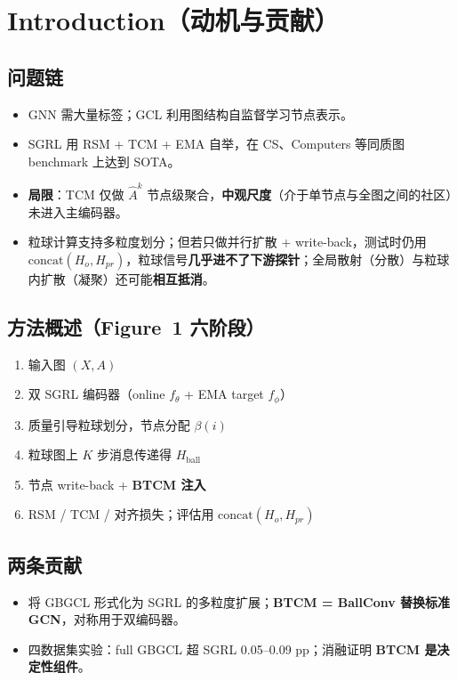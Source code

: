 \documentclass[11pt,a4paper]{article}
\begin{document}
\section{Introduction（动机与贡献）}

\subsection{问题链}
\begin{itemize}
  \item GNN 需大量标签；GCL 利用图结构自监督学习节点表示。
  \item SGRL 用 RSM + TCM + EMA 自举，在 CS、Computers 等同质图 benchmark 上达到 SOTA。
  \item \textbf{局限}：TCM 仅做 $\hat{A}^k$ 节点级聚合，\textbf{中观尺度}（介于单节点与全图之间的社区）未进入主编码器。
  \item 粒球计算支持多粒度划分；但若只做并行扩散 + write-back，测试时仍用 $\mathrm{concat}(H_o, H_{pr})$，粒球信号\textbf{几乎进不了下游探针}；全局散射（分散）与粒球内扩散（凝聚）还可能\textbf{相互抵消}。
\end{itemize}

\subsection{方法概述（Figure~1 六阶段）}
\begin{enumerate}
  \item[(a)] 输入图 $(X,A)$
  \item[(b)] 双 SGRL 编码器（online $f_\theta$ + EMA target $f_\phi$）
  \item[(c)] 质量引导粒球划分，节点分配 $\beta(i)$
  \item[(d)] 粒球图上 $K$ 步消息传递得 $H_{\mathrm{ball}}$
  \item[(e)] 节点 write-back + \textbf{BTCM 注入}
  \item[(f)] RSM / TCM / 对齐损失；评估用 $\mathrm{concat}(H_o, H_{pr})$
\end{enumerate}

\subsection{两条贡献}
\begin{itemize}
  \item 将 GBGCL 形式化为 SGRL 的多粒度扩展；\textbf{BTCM = BallConv 替换标准 GCN}，对称用于双编码器。
  \item 四数据集实验：full GBGCL 超 SGRL 0.05--0.09 pp；消融证明 \textbf{BTCM 是决定性组件}。
\end{itemize}
\end{document}
